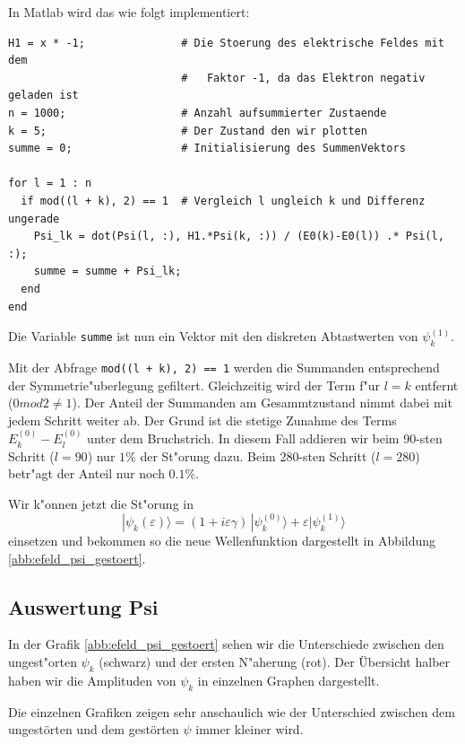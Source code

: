 \begin{refsection}
In Matlab wird das wie folgt implementiert:
\begin{lstlisting}[style=Matlab]
H1 = x * -1;               # Die Stoerung des elektrische Feldes mit dem
                           #   Faktor -1, da das Elektron negativ geladen ist
n = 1000;                  # Anzahl aufsummierter Zustaende
k = 5;                     # Der Zustand den wir plotten
summe = 0;                 # Initialisierung des SummenVektors

for l = 1 : n
  if mod((l + k), 2) == 1  # Vergleich l ungleich k und Differenz ungerade
    Psi_lk = dot(Psi(l, :), H1.*Psi(k, :)) / (E0(k)-E0(l)) .* Psi(l, :);
    summe = summe + Psi_lk;
  end
end
\end{lstlisting}
Die Variable \verb|summe| ist nun ein Vektor mit den diskreten Abtastwerten von $\psi_k^{(1)}$.

Mit der Abfrage \verb|mod((l + k), 2) == 1| werden die Summanden 
entsprechend der Symmetrie"uberlegung gefiltert.
Gleichzeitig wird der Term f"ur $l=k$ entfernt ($0 mod 2 \ne 1$).
Der Anteil der Summanden am Gesammtzustand nimmt dabei mit jedem Schritt weiter ab.
Der Grund ist die stetige Zunahme des Terms $E^{(0)}_k-E^{(0)}_l$ unter dem Bruchstrich.
In diesem Fall addieren wir beim 90-sten Schritt ($l=90$) nur $1\%$ der St"orung dazu.
Beim 280-sten Schritt ($l=280$) betr"agt der Anteil nur noch $0.1\%$.

Wir k"onnen jetzt die St"orung in 
\begin{equation}
|\psi_k(\varepsilon)\rangle
=
(1+i\varepsilon \gamma)
\,|\psi_k^{(0)}\rangle
+
\varepsilon|\psi_k^{(1)}\rangle
\end{equation}
einsetzen und bekommen so die neue Wellenfunktion dargestellt in Abbildung \ref{abb:efeld_psi_gestoert}.




\subsection{Auswertung Psi}

In der Grafik \ref{abb:efeld_psi_gestoert} sehen wir die Unterschiede zwischen den ungest"orten 
$\psi_k$ (schwarz) und der ersten N"aherung (rot).
Der \"Ubersicht halber haben wir die Amplituden von $\psi_k$ in einzelnen Graphen dargestellt.

Die einzelnen Grafiken zeigen sehr anschaulich wie der Unterschied zwischen dem ungest\"orten und dem gest\"orten $\psi$
immer kleiner wird.


\end{refsection}
